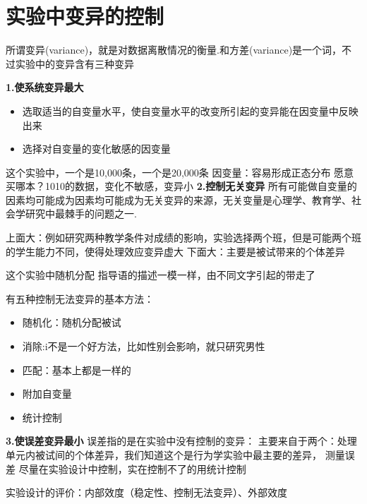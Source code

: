 \section{实验中变异的控制}
所谓变异(variance)，就是对数据离散情况的衡量.和方差(variance)是一个词，不过实验中的变异含有三种变异

\textbf{1.使系统变异最大}
	\begin{itemize}
		\item 选取适当的自变量水平，使自变量水平的改变所引起的变异能在因变量中反映出来
		\item 选择对自变量的变化敏感的因变量
	\end{itemize}

这个实验中，一个是10,000条，一个是20,000条
因变量：容易形成正态分布
愿意买哪本？1010的数据，变化不敏感，变异小
\textbf{2.控制无关变异}
所有可能做自变量的因素均可能成为因素均可能成为无关变异的来源，无关变量是心理学、教育学、社会学研究中最棘手的问题之一.

上面大：例如研究两种教学条件对成绩的影响，实验选择两个班，但是可能两个班的学生能力不同，使得处理效应变异虚大
下面大：主要是被试带来的个体差异

这个实验中随机分配
指导语的描述一模一样，由不同文字引起的带走了

有五种控制无法变异的基本方法：

\begin{itemize}
	\item 随机化：随机分配被试
	\item 消除:i不是一个好方法，比如性别会影响，就只研究男性
	\item 匹配：基本上都是一样的
	\item 附加自变量
	\item 统计控制
\end{itemize}
\textbf{3.使误差变异最小}
误差指的是在实验中没有控制的变异：
主要来自于两个：处理单元内被试间的个体差异，我们知道这个是行为学实验中最主要的差异，
测量误差
尽量在实验设计中控制，实在控制不了的用统计控制 

实验设计的评价：内部效度（稳定性、控制无法变异）、外部效度